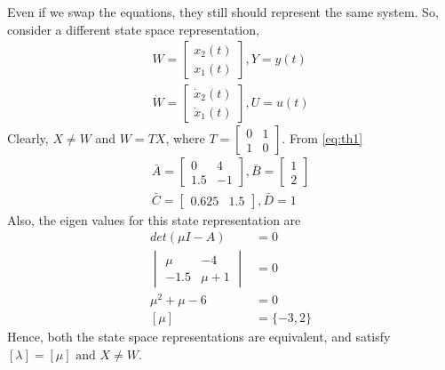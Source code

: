 \documentclass[journal,12pt,twocolumn]{IEEEtran}
\begin{document}
Even if we swap the equations, they still should represent the same system. So, consider a different state space representation, 
\begin{align}
    W=\begin{bmatrix}
    x_2(t)\\x_1(t)
    \end{bmatrix},Y=y(t)\\
    \dot W=\begin{bmatrix}
    \dot x_2(t)\\\dot x_1(t)
    \end{bmatrix},U=u(t)
\end{align}
Clearly, $X\neq W$ and $W=TX$, where $T=\begin{bmatrix}
0 & 1\\
1 & 0
\end{bmatrix}$. From \eqref{eq:th1}
\begin{align}
    \bar A=\begin{bmatrix}
    0 & 4\\
    1.5 & -1
    \end{bmatrix},\bar B=\begin{bmatrix}
    1\\
    2
    \end{bmatrix}\\
    \bar C=\begin{bmatrix}
    0.625 & 1.5
    \end{bmatrix},\bar D=1
\end{align}
Also, the eigen values for this state representation are
\begin{align}
    det(\mu I-A)&=0\\
    \begin{vmatrix}
    \mu & -4\\
    -1.5 & \mu+1
    \end{vmatrix}&=0\\
    \mu^2+\mu-6&=0\\
    [\mu]&=\{-3,2\}
\end{align}
Hence, both the state space representations are equivalent, and satisfy $[\lambda]=[\mu] \text{ and } X\neq W$.
\end{document}
